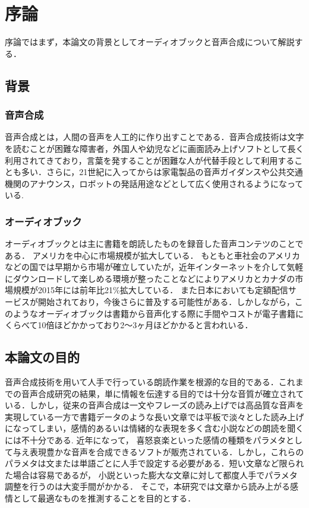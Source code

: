 \begin{comment}
- 主張
オーディオブックの作成にあたり
- 朗読システム
  - オーディオブック
    - 市場の拡大
  - 電子書籍
  - 課題
- 音声合成
  - 感情を込められる
  - 人手によるパラメタ調整
- 感情推定
  - EmotionML
\end{comment}

\chapter{序論}

序論ではまず，本論文の背景としてオーディオブックと音声合成について解説する．


\section{背景}

\subsection{音声合成}
音声合成とは，人間の音声を人工的に作り出すことである．音声合成技術は文字を読むことが困難な障害者，外国人や幼児などに画面読み上げソフトとして長く利用されてきており，言葉を発することが困難な人が代替手段として利用することも多い．さらに，21世紀に入ってからは家電製品の音声ガイダンスや公共交通機関のアナウンス，ロボットの発話用途などとして広く使用されるようになっている.


\subsection{オーディオブック}
オーディオブックとは主に書籍を朗読したものを録音した音声コンテツのことである．
アメリカを中心に市場規模が拡大している．
もともと車社会のアメリカなどの国では早期から市場が確立していたが，近年インターネットを介して気軽にダウンロードして楽しめる環境が整ったことなどによりアメリカとカナダの市場規模が2015年には前年比21\%拡大している．
また日本においても定額配信サービスが開始されており，今後さらに普及する可能性がある．しかしながら，このようなオーディオブックは書籍から音声化する際に手間やコストが電子書籍にくらべて10倍ほどかかっており2〜3ヶ月ほどかかると言われいる．


\section{本論文の目的}
音声合成技術を用いて人手で行っている朗読作業を根源的な目的である．これまでの音声合成研究の結果，単に情報を伝達する目的では十分な音質が確立されている．しかし，従来の音声合成は一文やフレーズの読み上げでは高品質な音声を実現している一方で書籍データのような長い文章では平板で淡々とした読み上げになってしまい，感情的あるいは情緒的な表現を多く含む小説などの朗読を聞くには不十分である.
近年になって， 喜怒哀楽といった感情の種類をパラメタとして与え表現豊かな音声を合成できるソフトが販売されている．しかし，これらのパラメタは文または単語ごとに人手で設定する必要がある．短い文章など限られた場合は容易であるが， 小説といった膨大な文章に対して都度人手でパラメタ調整を行うのは大変手間がかかる．
そこで，本研究では文章から読み上がる感情として最適なものを推測することを目的とする．


